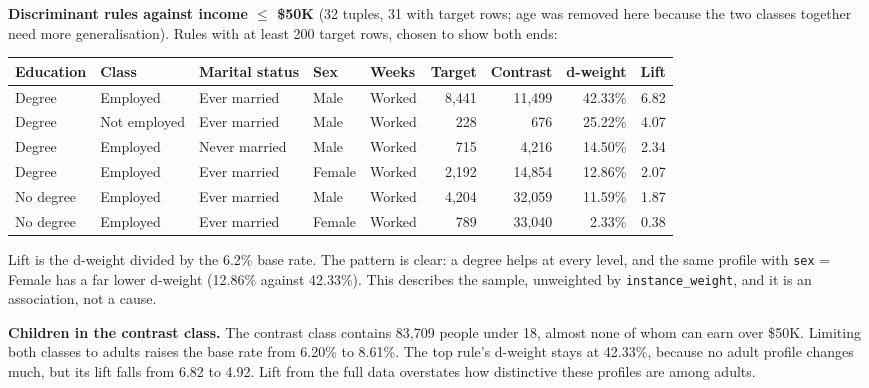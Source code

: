 \documentclass[10pt]{article}
\begin{document}
\textbf{Discriminant rules against income $\le$ \$50K} (32 tuples, 31 with target rows; age was removed here because the two classes together need more generalisation). Rules with at least 200 target rows, chosen to show both ends:
\begin{center}\small
\begin{tabular}{lllllrrrr}
\toprule
Education & Class & Marital status & Sex & Weeks & Target & Contrast & d-weight & Lift \\
\midrule
Degree & Employed & Ever married & Male & Worked & 8,441 & 11,499 & 42.33\% & 6.82 \\
Degree & Not employed & Ever married & Male & Worked & 228 & 676 & 25.22\% & 4.07 \\
Degree & Employed & Never married & Male & Worked & 715 & 4,216 & 14.50\% & 2.34 \\
Degree & Employed & Ever married & Female & Worked & 2,192 & 14,854 & 12.86\% & 2.07 \\
No degree & Employed & Ever married & Male & Worked & 4,204 & 32,059 & 11.59\% & 1.87 \\
No degree & Employed & Ever married & Female & Worked & 789 & 33,040 & 2.33\% & 0.38 \\
\bottomrule
\end{tabular}
\end{center}
Lift is the d-weight divided by the 6.2\% base rate. The pattern is clear: a degree helps at every level, and the same profile with \texttt{sex} = Female has a far lower d-weight (12.86\% against 42.33\%). This describes the sample, unweighted by \texttt{instance\_weight}, and it is an association, not a cause.

\textbf{Children in the contrast class.} The contrast class contains 83,709 people under 18, almost none of whom can earn over \$50K. Limiting both classes to adults raises the base rate from 6.20\% to 8.61\%. The top rule's d-weight stays at 42.33\%, because no adult profile changes much, but its lift falls from 6.82 to 4.92. Lift from the full data overstates how distinctive these profiles are among adults.
\end{document}
